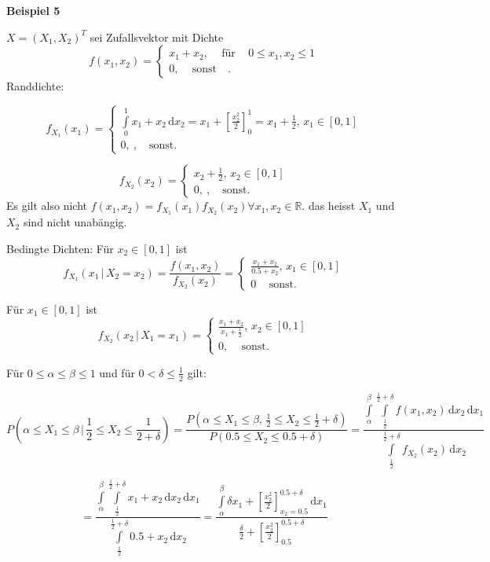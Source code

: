 \documentclass[12pt, a4paper]{article}
\theoremstyle{empty}
\newcommand{\R}{\mathbb{R}}
\newcommand{\1}{\mathds{1}}
\renewcommand{\d}{\,\mathrm{d}}
\providecommand{\mtext}[1]{\quad \text{#1} \quad}
\begin{document}
\textbf{Beispiel 5}

$ X = (X_1, X_2)^T $ sei Zufallsvektor mit Dichte 
\[ f(x_1, x_2) = \begin{cases} x_1 + x_2, \, \mtext{für} \, 0 \leq x_1, x_2 \leq 1  \\ 0, \, \mtext{sonst}. \end{cases}  \] 
Randdichte:

\[ f_{X_1}(x_1) = \begin{cases} \int\limits_{0}^1 x_1+ x_2 \d x_2 = x_1 + [\frac{x_2^2}{2}]_0^1 = x_1 + \frac{1}{2}, \, x_1 \in [0,1] \\ 0, \ ,\mtext{sonst.} \end{cases} \]

\[ f_{X_2}(x_2) = \begin{cases} x_2 + \frac{1}{2}, \, x_2 \in [0,1] \\ 0, \ ,\mtext{sonst.} \end{cases} \]
Es gilt also nicht $f(x_1, x_2) = f_{X_1}(x_1) f_{X_2}(x_2) \forall x_1, x_2 \in \R .$ das heisst $X_1$ und $X_2$ sind nicht unabängig.

Bedingte Dichten: Für $ x_2 \in [0,1]$ ist \[ f_{X_1}(x_1 \, | \,  X_2 = x_2) = \frac{f(x_1, x_2)}{f_{X_2}(x_2)} = \begin{cases} \frac{x_1 + x_2}{0.5 + x_2}, \, x_1 \in [0,1] \\0 \, \mtext{sonst.}  \end{cases} \]


Für $ x_1 \in [0,1]$ ist \[ f_{X_2}(x_2 \, | \, X_1 = x_1) = \begin{cases} \frac{x_1 + x_2}{x_1 + \frac{1}{2}}, \, x_2 \in [0,1] \\ 0, \, \mtext{sonst.} \end{cases} \]

Für $0 \leq \alpha \leq \beta \leq 1$ und für $0<\delta \leq \frac{1}{2}$ gilt:

\[ P (\alpha \leq X_1 \leq \beta\, | \, \frac{1}{2} \leq X_2 \leq \frac{1}{2 + \delta} )  = \frac{ P( \alpha \leq X_1 \leq \beta, \, \frac{1}{2} \leq X_2 \leq \frac{1}{2} + \delta )}{P(0.5 \leq X_2 \leq 0.5 + \delta)}  = \frac{\int\limits_\alpha^\beta \int\limits_{\frac{1}{2}}^{\frac{1}{2} + \delta} f(x_1, x_2) \d x_2 \d x_1}  {  \int\limits_{\frac{1}{2}}^{\frac{1}{2} + \delta} f_{X_2} (x_2) \d x_2 }  \]  

\[ = \frac{\int\limits_\alpha^\beta \int\limits_{\frac{1}{2}}^{\frac{1}{2} + \delta} x_1 + x_2 \d x_2 \d x_1}  {  \int\limits_{\frac{1}{2}}^{\frac{1}{2} + \delta} 0.5 + x_2  \d x_2 } =   \frac{\int\limits_{\alpha}^{\beta} \delta x_1 + [\frac{x_2^2}{2}]_{x_2 = 0.5}^{0.5 + \delta} \d x_1}  { \frac{\delta}{2} + [\frac{x_2^2}{2}]_{0.5}^{0.5 + \delta} } \]
\end{document}
